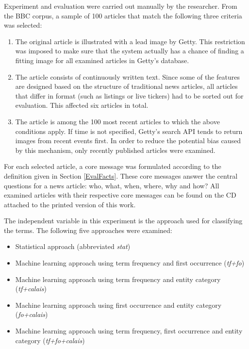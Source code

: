 \documentclass[11pt,a4paper,twoside]{article}
\begin{document}
Experiment and evaluation were carried out manually by the researcher. From the BBC corpus, a sample of 100 articles that match the following three criteria was selected:

\begin{enumerate}
    \setlength\itemsep{0em}
    \item The original article is illustrated with a lead image by Getty. This restriction was imposed to make sure that the system actually has a chance of finding a fitting image for all examined articles in Getty's database.
    \item The article consists of continuously written text. Since some of the features are designed based on the structure of traditional news articles, all articles that differ in format (such as listings or live tickers) had to be sorted out for evaluation. This affected six articles in total.
    \item The article is among the 100 most recent articles to which the above conditions apply. If time is not specified, Getty's search API tends to return images from recent events first. In order to reduce the potential bias caused by this mechanism, only recently published articles were examined.
\end{enumerate}

\noindent For each selected article, a core message was formulated according to the definition given in Section \ref{EvalFacts}. These core messages answer the central questions for a news article: who, what, when, where, why and how? All examined articles with their respective core messages can be found on the CD attached to the printed version of this work.

The independent variable in this experiment is the approach used for classifying the terms. The following five approaches were examined:

\begin{itemize}
    \setlength\itemsep{0em}
    \item Statistical approach (abbreviated \emph{stat})
    \item Machine learning approach using term frequency and first occurrence (\emph{tf+fo})
    \item Machine learning approach using term frequency and entity category (\emph{tf+calais})
    \item Machine learning approach using first occurrence and entity category (\emph{fo+calais})
    \item Machine learning approach using term frequency, first occurrence and entity category (\emph{tf+fo+calais})
\end{itemize}
\end{document}
